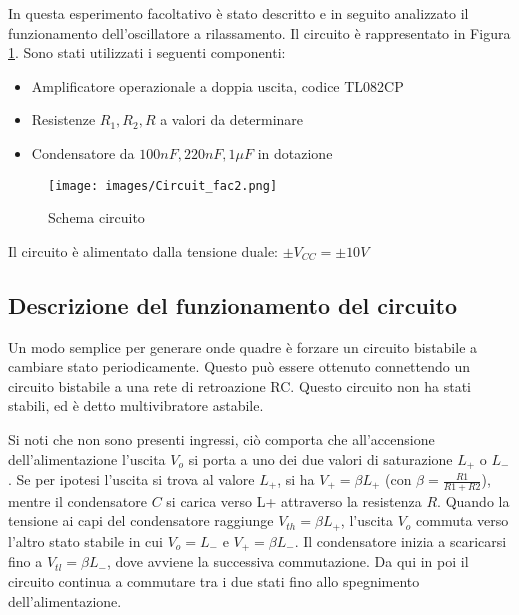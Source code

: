 In questa esperimento facoltativo è stato descritto e in seguito analizzato il funzionamento dell'oscillatore a rilassamento. Il circuito è rappresentato in Figura \ref{fig:Circuit_FAC2}. Sono stati utilizzati i seguenti componenti:
\begin{itemize}
    \item Amplificatore operazionale a doppia uscita, codice TL082CP
    \item Resistenze $R_1,R_2,R$ a valori da determinare
    \item Condensatore da $100nF,220nF,1\mu F$ in dotazione
\end{itemize}
\begin{figure}[H]
    \centering
    \texttt{[image: images/Circuit\_fac2.png]}
    \caption{Schema circuito}
    \label{fig:Circuit_FAC2}
\end{figure}
Il circuito è alimentato dalla tensione duale: $\pm V_{CC}=\pm10V$
\subsection{Descrizione del funzionamento del circuito}
Un modo semplice per generare onde quadre è forzare un circuito bistabile a cambiare stato periodicamente. Questo può essere ottenuto connettendo un circuito bistabile a una rete di retroazione RC. Questo circuito non ha stati stabili, ed è detto multivibratore astabile.

Si noti che non sono presenti ingressi, ciò comporta che all'accensione dell'alimentazione l'uscita $V_o$ si porta a uno dei due valori di saturazione $L_+$ o $L_-$.
Se per ipotesi l'uscita si trova al valore $L_+$, si ha $V_+=\beta L_+$ (con $\beta = \frac{R1}{R1+R2}$), mentre il condensatore $C$ si carica verso L+ attraverso la resistenza $R$. 
Quando la tensione ai capi del condensatore raggiunge $V_{th}=\beta L_+$, l'uscita $V_o$ commuta verso l'altro stato stabile in cui $V_o = L_-$ e $V_+ =\beta L_-$.
Il condensatore inizia a scaricarsi fino a $V_{tl} = \beta L_-$, dove avviene la successiva commutazione.
Da qui in poi il circuito continua a commutare tra i due stati fino allo spegnimento dell'alimentazione.
